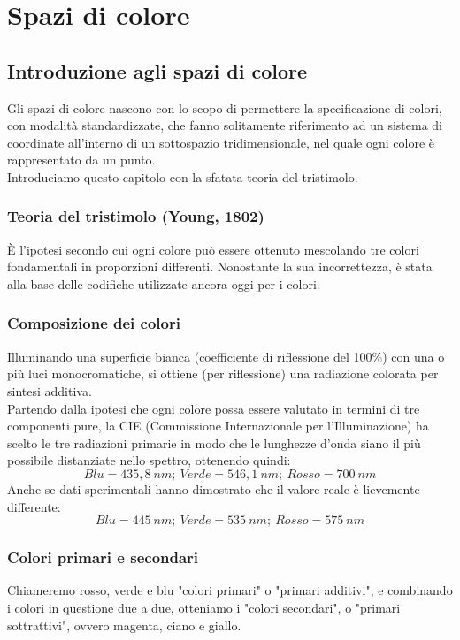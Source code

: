 \documentclass{report}
\begin{document}
	\chapter{Spazi di colore}
	\section{Introduzione agli spazi di colore}
	Gli spazi di colore nascono con lo scopo di permettere la specificazione di colori, con modalità standardizzate, che fanno solitamente riferimento ad un sistema di coordinate all'interno di un sottospazio tridimensionale, nel quale ogni colore è rappresentato da un punto.\\
	Introduciamo questo capitolo con la sfatata teoria del tristimolo.
	\subsection{Teoria del tristimolo (Young, 1802)}
	È l'ipotesi secondo cui ogni colore può essere ottenuto mescolando tre colori fondamentali in proporzioni differenti. Nonostante la sua incorrettezza, è stata alla base delle codifiche utilizzate ancora oggi per i colori.
		
	\subsection{Composizione dei colori}
	Illuminando una superficie bianca (coefficiente di riflessione del 100\%) con una o più luci monocromatiche, si ottiene (per riflessione) una radiazione colorata per sintesi additiva.\\
	Partendo dalla ipotesi che ogni colore possa essere valutato in termini di tre componenti pure, la CIE (Commissione Internazionale per l'Illuminazione) ha scelto le tre radiazioni primarie in modo che le lunghezze d'onda siano il più possibile distanziate nello spettro, ottenendo quindi:
	$$
	Blu = 435,8 \ nm; \ Verde = 546,1 \ nm; \ Rosso=700 \ nm
	$$
	Anche se dati sperimentali hanno dimostrato che il valore reale è lievemente differente:
	$$
	Blu = 445 \ nm; \ Verde = 535 \ nm; \ Rosso=575 \ nm
	$$
	\subsection{Colori primari e secondari}
	Chiameremo rosso, verde e blu "colori primari" o "primari additivi", e combinando i colori in questione due a due, otteniamo i "colori secondari", o "primari sottrattivi", ovvero magenta, ciano e giallo.
\end{document}
